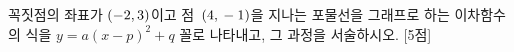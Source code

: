꼭짓점의 좌표가 $(-2{,}\mkern3mu 3)$이고 점~$(4{,}\mkern3mu -1)$을 지나는 포물선을 그래프로 하는 이차함수의 식을 $y=a(x-p)^2+q$ 꼴로 나타내고, 그 과정을 서술하시오.  \mbox{[5점]}
